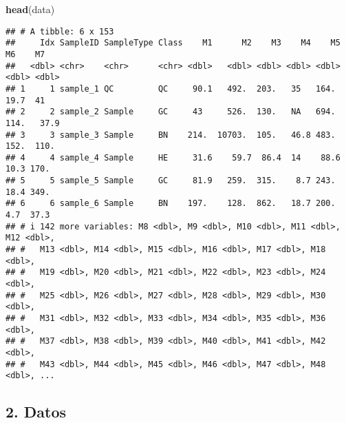 \documentclass[
]{article}
\newenvironment{Shaded}{\begin{snugshade}}{\end{snugshade}}
\newcommand{\FunctionTok}[1]{\textcolor[rgb]{0.13,0.29,0.53}{\textbf{#1}}}
\newcommand{\NormalTok}[1]{#1}
\begin{document}
\begin{Shaded}
\begin{Highlighting}[]
\FunctionTok{head}\NormalTok{(data)}
\end{Highlighting}
\end{Shaded}

\begin{verbatim}
## # A tibble: 6 x 153
##     Idx SampleID SampleType Class    M1      M2    M3    M4    M5    M6    M7
##   <dbl> <chr>    <chr>      <chr> <dbl>   <dbl> <dbl> <dbl> <dbl> <dbl> <dbl>
## 1     1 sample_1 QC         QC     90.1   492.  203.   35   164.   19.7  41  
## 2     2 sample_2 Sample     GC     43     526.  130.   NA   694.  114.   37.9
## 3     3 sample_3 Sample     BN    214.  10703.  105.   46.8 483.  152.  110. 
## 4     4 sample_4 Sample     HE     31.6    59.7  86.4  14    88.6  10.3 170. 
## 5     5 sample_5 Sample     GC     81.9   259.  315.    8.7 243.   18.4 349. 
## 6     6 sample_6 Sample     BN    197.    128.  862.   18.7 200.    4.7  37.3
## # i 142 more variables: M8 <dbl>, M9 <dbl>, M10 <dbl>, M11 <dbl>, M12 <dbl>,
## #   M13 <dbl>, M14 <dbl>, M15 <dbl>, M16 <dbl>, M17 <dbl>, M18 <dbl>,
## #   M19 <dbl>, M20 <dbl>, M21 <dbl>, M22 <dbl>, M23 <dbl>, M24 <dbl>,
## #   M25 <dbl>, M26 <dbl>, M27 <dbl>, M28 <dbl>, M29 <dbl>, M30 <dbl>,
## #   M31 <dbl>, M32 <dbl>, M33 <dbl>, M34 <dbl>, M35 <dbl>, M36 <dbl>,
## #   M37 <dbl>, M38 <dbl>, M39 <dbl>, M40 <dbl>, M41 <dbl>, M42 <dbl>,
## #   M43 <dbl>, M44 <dbl>, M45 <dbl>, M46 <dbl>, M47 <dbl>, M48 <dbl>, ...
\end{verbatim}

\subsection{2. Datos}\label{datos}
\end{document}
